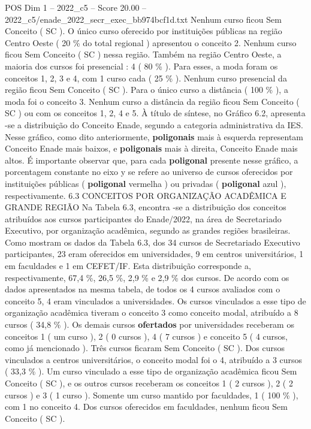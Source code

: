 \begin{textsample}{POS Dim 1 – 2022\_c5 – Score 20.00 – 2022\_c5/enade\_2022\_secr\_exec\_bb974bcf1d.txt}
Nenhum curso ficou Sem Conceito ( SC ).
O único curso oferecido por instituições públicas na região Centro Oeste ( 20 \% do total regional ) apresentou o conceito 2.
Nenhum curso ficou Sem Conceito ( SC ) nessa região.
Também na região Centro Oeste, a maioria dos cursos foi presencial : 4 ( 80 \% ).
Para esses, a moda foram os conceitos 1, 2, 3 e 4, com 1 curso cada ( 25 \% ).
Nenhum curso presencial da região ficou Sem Conceito ( SC ).
Para o único curso a distância ( 100 \% ), a moda foi o conceito 3.
Nenhum curso a distância da região ficou Sem Conceito ( SC ) ou com os conceitos 1, 2, 4 e 5.
À título de síntese, no Gráfico 6.2, apresenta -se a distribuição do Conceito Enade, segundo a categoria administrativa da IES.
Nesse gráfico, como dito anteriormente, \textbf{poligonais} mais à esquerda representam Conceito Enade mais baixos, e \textbf{poligonais} mais à direita, Conceito Enade mais altos.
É importante observar que, para cada \textbf{poligonal} presente nesse gráfico, a porcentagem constante no eixo y se refere ao universo de cursos oferecidos por instituições públicas ( \textbf{poligonal} vermelha ) ou privadas ( \textbf{poligonal} azul ), respectivamente. 6.3 CONCEITOS POR ORGANIZAÇÃO ACADÊMICA E GRANDE REGIÃO Na Tabela 6.3, encontra -se a distribuição dos conceitos atribuídos aos cursos participantes do Enade/2022, na área de Secretariado Executivo, por organização acadêmica, segundo as grandes regiões brasileiras.
Como mostram os dados da Tabela 6.3, dos 34 cursos de Secretariado Executivo participantes, 23 eram oferecidos em universidades, 9 em centros universitários, 1 em faculdades e 1 em CEFET/IF.
Esta distribuição corresponde a, respectivamente, 67,4 \%, 26,5 \%, 2,9 \% e 2,9 \% dos cursos.
De acordo com os dados apresentados na mesma tabela, de todos os 4 cursos avaliados com o conceito 5, 4 eram vinculados a universidades.
Os cursos vinculados a esse tipo de organização acadêmica tiveram o conceito 3 como conceito modal, atribuído a 8 cursos ( 34,8 \% ).
Os demais cursos \textbf{ofertados} por universidades receberam os conceitos 1 ( um curso ), 2 ( 0 cursos ), 4 ( 7 cursos ) e conceito 5 ( 4 cursos, como já mencionado ).
Três cursos ficaram Sem Conceito ( SC ).
Dos cursos vinculados a centros universitários, o conceito modal foi o 4, atribuído a 3 cursos ( 33,3 \% ).
Um curso vinculado a esse tipo de organização acadêmica ficou Sem Conceito ( SC ), e os outros cursos receberam os conceitos 1 ( 2 cursos ), 2 ( 2 cursos ) e 3 ( 1 curso ).
Somente um curso mantido por faculdades, 1 ( 100 \% ), com 1 no conceito 4.
Dos cursos oferecidos em faculdades, nenhum ficou Sem Conceito ( SC ).

\end{textsample}
